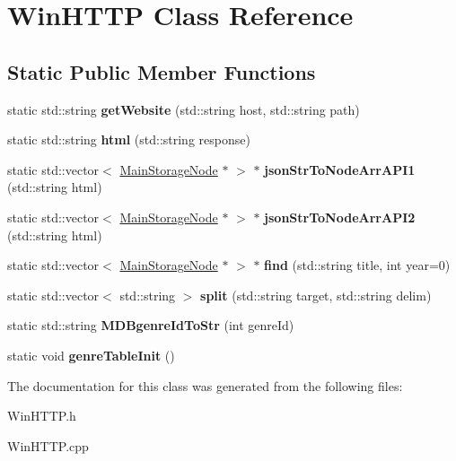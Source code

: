 \hypertarget{class_win_h_t_t_p}{}\section{Win\+H\+T\+TP Class Reference}
\label{class_win_h_t_t_p}
\subsection*{Static Public Member Functions}
\begin{DoxyCompactItemize}
\item 
\mbox{\label{class_win_h_t_t_p_a85e23c7eee92f8841fb25e9e449cfee1}} 
static std\+::string {\bfseries get\+Website} (std\+::string host, std\+::string path)
\item 
\mbox{\label{class_win_h_t_t_p_a37afa3b3fdb8e4172af39d6fd729442d}} 
static std\+::string {\bfseries html} (std\+::string response)
\item 
\mbox{\label{class_win_h_t_t_p_a959664822851ca06b6f8a7431cff135e}} 
static std\+::vector$<$ \hyperlink{class_main_storage_node}{Main\+Storage\+Node} $\ast$ $>$ $\ast$ {\bfseries json\+Str\+To\+Node\+Arr\+A\+P\+I1} (std\+::string html)
\item 
\mbox{\label{class_win_h_t_t_p_ad5f5dbd3b9453b18f4d9020287df3a09}} 
static std\+::vector$<$ \hyperlink{class_main_storage_node}{Main\+Storage\+Node} $\ast$ $>$ $\ast$ {\bfseries json\+Str\+To\+Node\+Arr\+A\+P\+I2} (std\+::string html)
\item 
\mbox{\label{class_win_h_t_t_p_a31354dacc2cb7888e8e2898edade8199}} 
static std\+::vector$<$ \hyperlink{class_main_storage_node}{Main\+Storage\+Node} $\ast$ $>$ $\ast$ {\bfseries find} (std\+::string title, int year=0)
\item 
\mbox{\label{class_win_h_t_t_p_afdc2eeae505257275df49b4121506f57}} 
static std\+::vector$<$ std\+::string $>$ {\bfseries split} (std\+::string target, std\+::string delim)
\item 
\mbox{\label{class_win_h_t_t_p_aeeacd2ab2b54f3101353679eba482fe9}} 
static std\+::string {\bfseries M\+D\+Bgenre\+Id\+To\+Str} (int genre\+Id)
\item 
\mbox{\label{class_win_h_t_t_p_acf98fc4a9b0a84edcbf4b5732a47655f}} 
static void {\bfseries genre\+Table\+Init} ()
\end{DoxyCompactItemize}


The documentation for this class was generated from the following files\+:\begin{DoxyCompactItemize}
\item 
Win\+H\+T\+T\+P.\+h\item 
Win\+H\+T\+T\+P.\+cpp\end{DoxyCompactItemize}
